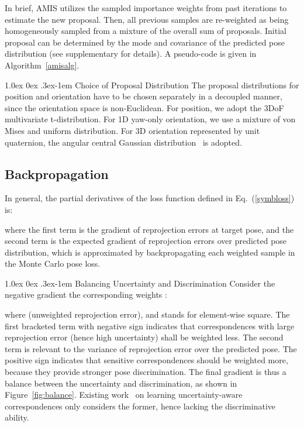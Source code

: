 \documentclass[10pt,twocolumn,letterpaper]{article}
\makeatletter
\renewcommand{\paragraph}{
  \@startsection{paragraph}{4}
  {\z@}{1.0ex \@plus 0ex \@minus .3ex}{-1em}
  {\normalfont\normalsize\bfseries}
}
\makeatother
\begin{document}
In brief, AMIS utilizes the sampled importance weights from past iterations to estimate the new proposal. Then, all previous samples are re-weighted as being homogeneously sampled from a mixture of the overall sum of proposals. Initial proposal can be determined by the mode and covariance of the predicted pose distribution (see supplementary for details). A pseudo-code is given in Algorithm~\ref{amisalg}.


\paragraph{Choice of Proposal Distribution} 
The proposal distributions for position and orientation have to be chosen separately in a decoupled manner, since the orientation space is non-Euclidean. For position, we adopt the 3DoF multivariate t-distribution.
For 1D yaw-only orientation, we use a mixture of von Mises and uniform distribution. For 3D orientation represented by unit quaternion, the angular central Gaussian distribution~\cite{ACG} is adopted. 


\subsection{Backpropagation} \label{backprop}



In general, the partial derivatives of the loss function defined in Eq.~(\ref{symbloss}) is:
\vspace{-1ex}

where the first term is the gradient of reprojection errors at target pose, and the second term is the expected gradient of reprojection errors over predicted pose distribution, which is approximated by backpropagating each weighted sample in the Monte Carlo pose loss.

\paragraph{Balancing Uncertainty and Discrimination} Consider the negative gradient \wrt the corresponding weights :

where  (unweighted reprojection error), and  stands for element-wise square. The first bracketed term  with negative sign indicates that correspondences with large reprojection error (hence high uncertainty) shall be weighted less. The second term  is relevant to the variance of reprojection error over the predicted pose. The positive sign indicates that sensitive correspondences should be weighted more, because they provide stronger pose discrimination. The final gradient is thus a balance between the uncertainty and discrimination, as shown in Figure~\ref{fig:balance}. Existing work~\cite{monorun, pvnet} on learning uncertainty-aware correspondences only considers the former, hence lacking the discriminative ability.
\end{document}
